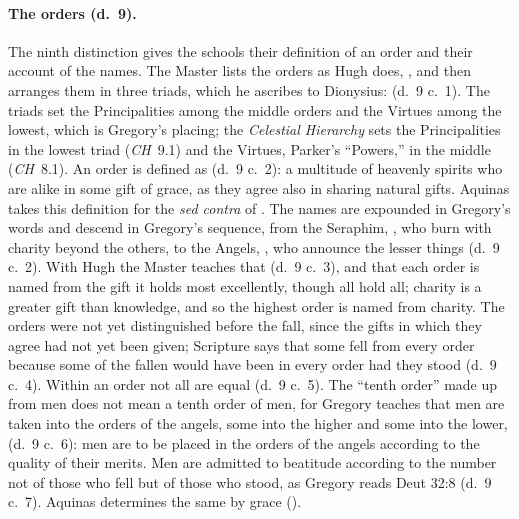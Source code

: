 \paragraph{The orders (d.~9).} The ninth distinction gives the schools
their definition of an order and their account of the names. The Master
lists the orders as Hugh does, , and then
arranges them in three triads, which he ascribes to Dionysius:
 (d.~9
c.~1). The triads set the Principalities among the middle orders and the
Virtues among the lowest, which is Gregory's placing; the \emph{Celestial
Hierarchy} sets the Principalities in the lowest triad (\emph{CH}~9.1) and
the Virtues, Parker's ``Powers,'' in the middle (\emph{CH}~8.1). An order is
defined as  (d.~9 c.~2): a multitude of heavenly spirits who are alike in
some gift of grace, as they agree also in sharing natural gifts. Aquinas
takes this definition for the \emph{sed contra} of . The
names are expounded in Gregory's words and descend in Gregory's sequence,
from the Seraphim, , who burn with
charity beyond the others, to the Angels, , who announce
the lesser things (d.~9 c.~2). With Hugh the Master teaches
that 
(d.~9 c.~3), and that each order is named from the gift it holds most
excellently, though all hold all; charity is a greater gift than knowledge,
and so the highest order is named from charity. The orders were not yet
distinguished before the fall, since the gifts in which they agree had not
yet been given; Scripture says that some fell from every order because some
of the fallen would have been in every order had they stood (d.~9 c.~4).
Within an order not all are equal (d.~9 c.~5). The ``tenth order'' made up
from men does not mean a tenth order of men, for Gregory teaches that men
are taken into the orders of the angels, some into the higher and some into
the lower,  (d.~9 c.~6): men are to be placed in the orders of the angels
according to the quality of their merits. Men are admitted to beatitude
according to the number not of those who fell but of those who stood, as
Gregory reads Deut 32:8 (d.~9 c.~7). Aquinas determines the same by grace
().


